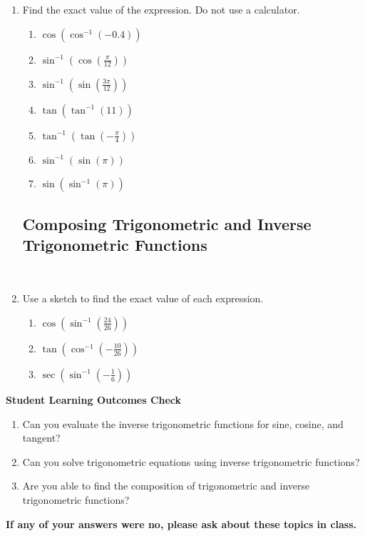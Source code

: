 \begin{enumerate}
\item Find the exact value of the expression.  Do not use a calculator.
\begin{enumerate}
\item $\displaystyle \cos\left(\cos^{-1}(-0.4)\right)$\vfill
\item  $\displaystyle \sin^{-1}\left(\cos\left(\frac{\pi}{12}\right)\right)$\vfill
\item $\displaystyle \sin^{-1}\left(\sin\left(\frac{3\pi}{12}\right)\right)$\vfill
\newpage
\item $\displaystyle \tan\left(\tan^{-1}(11)\right)$\vfill
\item  $\displaystyle \tan^{-1}\left(\tan\left(-\frac{\pi}{4}\right)\right)$\vfill
\item  $\displaystyle \sin^{-1}\left(\sin(\pi)\right)$\vfill
\item $\displaystyle \sin\left(\sin^{-1}\left(\pi\right)\right)$\vfill
\end{enumerate}

\subsection{Composing Trigonometric and Inverse Trigonometric  Functions} ~

\item Use a sketch to find the exact value of each expression.
\begin{enumerate}
\item $\displaystyle \cos\left(\sin^{-1}\left(\frac{24}{26}\right)\right)$\vfill
\vfill
\newpage
\item $\displaystyle \tan\left(\cos^{-1}\left(-\frac{10}{26}\right)\right)$\vfill
\item $\displaystyle \sec\left(\sin^{-1}\left(-\frac{1}{6}\right)\right)$\vfill
\end{enumerate}


\end{enumerate}
\vfill
\noindent \textbf{Student Learning Outcomes Check}

\begin{enumerate}
\item Can you evaluate the inverse trigonometric functions for sine, cosine, and tangent?
\item Can you solve trigonometric equations using inverse trigonometric functions?
\item Are you able to find the composition of trigonometric and inverse trigonometric functions?

\end{enumerate}

\noindent \textbf{If any of your answers were no, please ask about these topics in class.}

